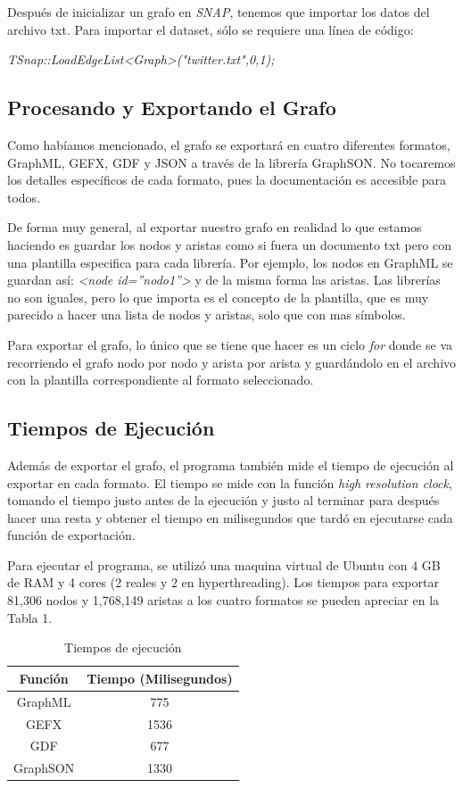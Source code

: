 \documentclass{sig-alternate-05-2015}
\begin{document}
Después de inicializar un grafo en \textit{SNAP}, tenemos que importar los datos del archivo txt. Para importar el dataset, sólo se requiere una línea de código: 

\textit{TSnap::LoadEdgeList<Graph>("twitter.txt",0,1);}


\subsection{Procesando y Exportando el Grafo}
Como habíamos mencionado, el grafo se exportará en cuatro diferentes formatos, GraphML, GEFX, GDF y JSON a través de la librería GraphSON. No tocaremos los detalles específicos de cada formato, pues la documentación es accesible para todos.

De forma muy general, al exportar nuestro grafo en realidad lo que estamos haciendo es guardar los nodos y aristas como si fuera un documento txt pero con una plantilla especifica para cada librería. Por ejemplo, los nodos en GraphML se guardan así: \textit{<node id=”nodo1”>} y de la misma forma las aristas. Las librerías no son iguales, pero lo que importa es el concepto de la plantilla, que es muy parecido a hacer una lista de nodos y aristas, solo que con mas símbolos.

Para exportar el grafo, lo único que se tiene que hacer es un ciclo \textit{for} donde se va recorriendo el grafo nodo por nodo y arista por arista y guardándolo en el archivo con la plantilla correspondiente al formato seleccionado.

\subsection{Tiempos de Ejecución}
Además de exportar el grafo, el programa también mide el tiempo de ejecución al exportar en cada formato. El tiempo se mide con la función \textit{high resolution clock}, tomando el tiempo justo antes de la ejecución y justo al terminar para después hacer una resta y obtener el tiempo en milisegundos que tardó en ejecutarse cada función de exportación. 

Para ejecutar el programa, se utilizó una maquina virtual de Ubuntu con 4 GB de RAM y 4 cores (2 reales y 2 en hyperthreading). Los tiempos para exportar 81,306 nodos y 1,768,149 aristas a los cuatro formatos se pueden apreciar en la Tabla 1.

\begin{table}
\centering
\caption{Tiempos de ejecución}
\begin{tabular}{|c|c|} \hline
Función&Tiempo (Milisegundos)\\ \hline
GraphML & 775\\ \hline
GEFX & 1536\\ \hline
GDF & 677\\ \hline
GraphSON & 1330\\
\hline\end{tabular}
\end{table}
\end{document}

